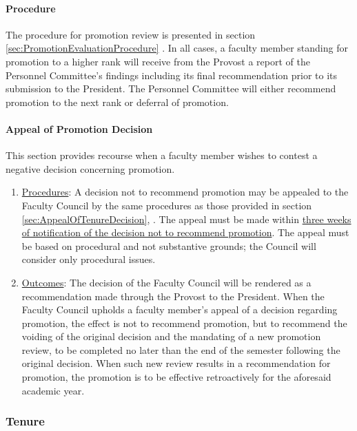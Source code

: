 			\paragraph{Procedure}
				The procedure for promotion review is presented in
				section
				\ref{sec:PromotionEvaluationProcedure}
				.  In all cases, a faculty member standing for promotion to a higher rank will receive from the Provost a report of the Personnel Committee's findings including its final recommendation prior to its submission to the President.  The Personnel Committee will either recommend promotion to the next rank or deferral of promotion.
			\paragraph{Appeal of Promotion Decision}
				This section provides recourse when a faculty member wishes to contest a negative decision concerning promotion.
				\begin{enumerate}[label=\alph*)]
					\item{\underline{Procedures}:
						A decision not to recommend promotion may be appealed to the Faculty Council by the same procedures as those provided in
						section
						\ref{sec:AppealOfTenureDecision},
						. The appeal must be made within \underline{three weeks of notification of the decision not to recommend promotion}. The appeal must be based on procedural and not substantive grounds; the Council will consider only procedural issues.}
					\item{\underline{Outcomes}:
						The decision of the Faculty Council will be rendered as a recommendation made through the Provost to the President. When the Faculty Council upholds a faculty member's appeal of a decision regarding promotion, the effect is not to recommend promotion, but to recommend the voiding of the original decision and the mandating of a new promotion review, to be completed no later than the end of the semester following the original decision.  When such new review results in a recommendation for promotion, the promotion is to be effective retroactively for the aforesaid academic year.}
				\end{enumerate}
		\subsubsection{Tenure}
			\label{sec:Tenure}

